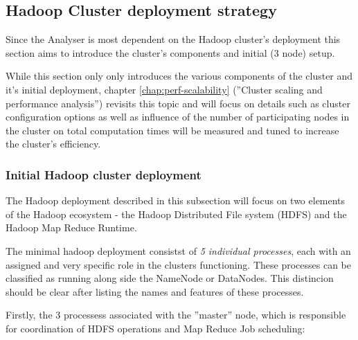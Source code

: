 \subsection{Hadoop Cluster deployment strategy}
\label{sec:deployment-strategy}

Since the Analyser is most dependent on the Hadoop cluster's deployment this section aims to introduce the cluster's components and initial (3 node) setup. 

While this section only only introduces the various components of the cluster and it's initial deployment, chapter \ref{chap:perf-scalability} (''Cluster scaling and performance analysis'') revisits this topic and will focus on details such as cluster configuration options as well as influence of the number of participating nodes in the cluster on total computation times will be measured and tuned to increase the cluster's efficiency.

\subsubsection{Initial Hadoop cluster deployment}

The Hadoop deployment described in this subsection will focus on two elements of the Hadoop ecosystem - the Hadoop Distributed File system (HDFS) and the Hadoop Map Reduce Runtime.

The minimal hadoop deployment consistst of \textit{5 individual processes}, each with an assigned and very specific role in the clusters functioning. These processes can be classified as running along side the NameNode or DataNodes. This distincion should be clear after listing the names and features of these processes.

Firstly, the 3 processess associated with the ''master'' node, which is responsible for coordination of HDFS operations and Map Reduce Job scheduling:

